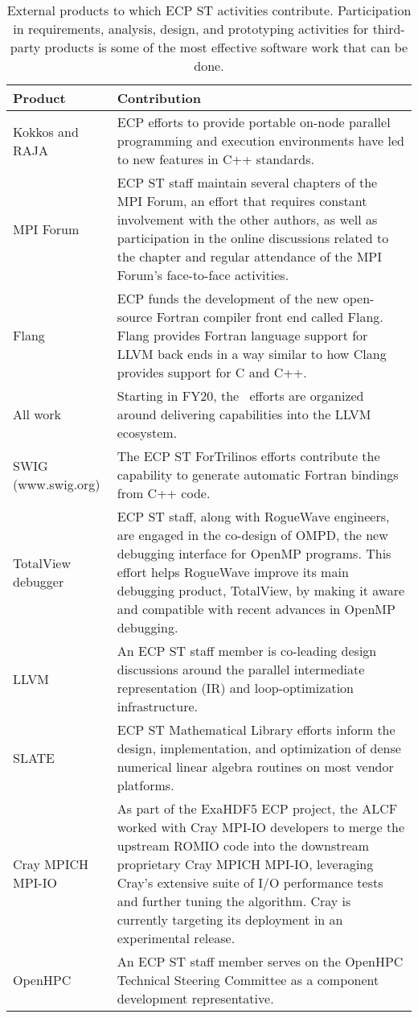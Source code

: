 \begin{table}
	\begin{tabular}{|L{1.5in}|L{4in}|}\hline
			Product & Contribution\\\hline
			Kokkos and RAJA & ECP efforts to provide portable on-node parallel programming and execution environments have led to new features in C++ standards. \\\hline
			MPI Forum & ECP ST staff maintain several chapters of the MPI Forum, an effort that requires constant involvement with the other authors, as well as participation in the online discussions related to the chapter and regular attendance of the MPI Forum's face-to-face activities.\\\hline
			Flang & ECP funds the development of the new open-source Fortran compiler front end called Flang. Flang provides Fortran language support for LLVM back ends in a way similar to how Clang provides support for C and C++.\\\hline 
			All \tools work & Starting in FY20, the \tools\ efforts are organized around delivering capabilities into the LLVM ecosystem.  \\\hline
			SWIG (www.swig.org) & The ECP ST ForTrilinos efforts contribute the capability to generate automatic Fortran bindings from C++ code.\\\hline
			TotalView debugger & ECP ST staff, along with RogueWave engineers, are engaged in the co-design of OMPD, the new debugging interface for OpenMP programs. This effort helps RogueWave improve its main debugging product, TotalView, by making it aware and compatible with recent advances in OpenMP debugging.\\\hline
			LLVM &  An ECP ST staff member is co-leading design discussions around the parallel intermediate representation (IR) and loop-optimization infrastructure.\\\hline
			SLATE & ECP ST Mathematical Library efforts inform the design, implementation, and optimization of dense numerical linear algebra routines on most vendor platforms.\\\hline
			Cray MPICH MPI-IO & As part of the ExaHDF5 ECP project, the ALCF worked with Cray MPI-IO developers to merge the upstream ROMIO code into the downstream proprietary Cray MPICH MPI-IO, leveraging Cray’s extensive suite of I/O performance tests and further tuning the algorithm.  Cray is currently targeting its deployment in an experimental release.\\\hline
			OpenHPC & An ECP ST staff member serves on the OpenHPC Technical Steering Committee as a component development representative.\\\hline
		\end{tabular}
		\centering
		\caption{\label{table:externalproducts} External products to which ECP ST activities contribute.  Participation in requirements, analysis, design, and prototyping activities for third-party products is some of the most effective software work that can be done.}
	\end{table}
